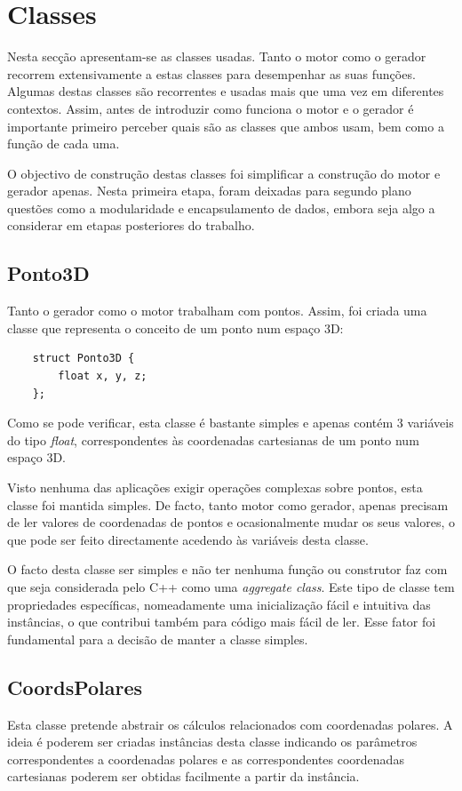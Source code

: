 \chapter{Classes}
\label{cap:p1}

Nesta secção apresentam-se as classes usadas. Tanto o motor como o gerador recorrem extensivamente a estas classes para desempenhar as suas funções. Algumas destas classes são recorrentes e usadas mais que uma vez em diferentes contextos. Assim, antes de introduzir como funciona o motor e o gerador é importante primeiro perceber quais são as classes que ambos usam, bem como a função de cada uma.

O objectivo de construção destas classes foi simplificar a construção do motor e gerador apenas. Nesta primeira etapa, foram deixadas para segundo plano questões como a modularidade e encapsulamento de dados, embora seja algo a considerar em etapas posteriores do trabalho.

\section{Ponto3D}

Tanto o gerador como o motor trabalham com pontos. Assim, foi criada uma classe que representa o conceito de um ponto num espaço 3D:

\begin{Verbatim}
	struct Ponto3D {
		float x, y, z;
	};
\end{Verbatim}

Como se pode verificar, esta classe é bastante simples e apenas contém 3 variáveis do tipo \textit{float}, correspondentes às coordenadas cartesianas de um ponto num espaço 3D.

Visto nenhuma das aplicações exigir operações complexas sobre pontos, esta classe foi mantida simples. De facto, tanto motor como gerador, apenas precisam de ler valores de coordenadas de pontos e ocasionalmente mudar os seus valores, o que pode ser feito directamente acedendo às variáveis desta classe.

O facto desta classe ser simples e não ter nenhuma função ou construtor faz com que seja considerada pelo C++ como uma \textit{aggregate class}. Este tipo de classe tem propriedades específicas, nomeadamente uma inicialização fácil e intuitiva das instâncias, o que contribui também para código mais fácil de ler. Esse fator foi fundamental para a decisão de manter a classe simples.

\newpage
\section{CoordsPolares}
\label{p1:coordsPolares}
Esta classe pretende abstrair os cálculos relacionados com coordenadas polares. A ideia é poderem ser criadas instâncias desta classe indicando os parâmetros correspondentes a coordenadas polares e as correspondentes coordenadas cartesianas poderem ser obtidas facilmente a partir da instância.


